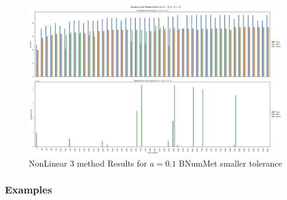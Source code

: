 \begin{figure}
    \centering
    \includegraphics[width=\textwidth]{Include/Images/Thesis/Analysis of Solutions/NonLinear AS/NonLinear 3 method Results Small Tol Bnum a-0.1.png}
    \caption{NonLinear 3 method Results for $a=0.1$ BNumMet smaller tolerance}
\label{fig:NonLinear 3 method Results for a=0.1 BNumMet smaller tolerance}
\end{figure}


\subsubsection{Examples}
	
